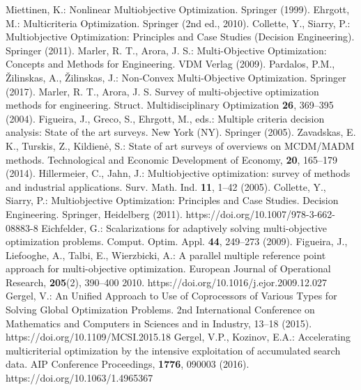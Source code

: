 \documentclass[runningheads]{llncs}
\begin{document}
%
%
%
\begin{thebibliography}{1}
\providecommand{\url}[1]{\texttt{#1}}
\providecommand{\urlprefix}{URL }
\providecommand{\doi}[1]{https://doi.org/#1}

 Miettinen, K.: Nonlinear Multiobjective Optimization. Springer (1999).
 Ehrgott, M.: Multicriteria Optimization. Springer (2nd ed., 2010).
 Collette, Y., Siarry, P.:  Multiobjective Optimization: Principles and Case Studies (Decision Engineering). Springer (2011).
 Marler, R. T., Arora, J. S.: Multi-Objective Optimization: Concepts and Methods for Engineering. VDM Verlag (2009).
 Pardalos, P.M., {\v Z}ilinskas, A., {\v Z}ilinskas, J.: Non-Convex Multi-Objective Optimization. Springer (2017).
 Marler, R. T., Arora, J. S. Survey of multi-objective optimization methods for engineering. Struct. Multidisciplinary Optimization \textbf{26}, 369--395 (2004).
  Figueira, J., Greco, S., Ehrgott, M., eds.: Multiple criteria decision analysis: State of the art surveys. New York (NY). Springer (2005).
 Zavadskas, E. K., Turskis, Z., Kildien{\. e}, S.: State of art surveys of overviews on MCDM/MADM methods. Technological and Economic Development of Economy, \textbf{20}, 165--179 (2014).
 Hillermeier, C., Jahn, J.: Multiobjective optimization: survey of methods and industrial applications. Surv. Math. Ind. \textbf{11}, 1--42 (2005).
 Collette, Y., Siarry, P.: Multiobjective Optimization: Principles and Case Studies. Decision Engineering. Springer, Heidelberg (2011). \doi{10.1007/978-3-662-08883-8}
 Eichfelder, G.: Scalarizations for adaptively solving multi-objective optimization problems. Comput. Optim. Appl. \textbf{44}, 249--273 (2009).
 Figueira, J., Liefooghe, A., Talbi, E., Wierzbicki, A.: A parallel multiple reference point approach for multi-objective optimization. European Journal of Operational Research, \textbf{205}(2), 390--400 2010. \doi{10.1016/j.ejor.2009.12.027}
 Gergel, V.: An Unified Approach to Use of Coprocessors of Various Types for Solving Global Optimization Problems. 2nd International Conference on Mathematics and Computers in Sciences and in Industry, 13--18 (2015). \doi{10.1109/MCSI.2015.18}
 Gergel, V.P., Kozinov, E.A.: Accelerating multicriterial optimization by the intensive exploitation of accumulated search data. AIP Conference Proceedings, \textbf{1776}, 090003 (2016). \doi{10.1063/1.4965367}

\end{thebibliography}
\end{document}
